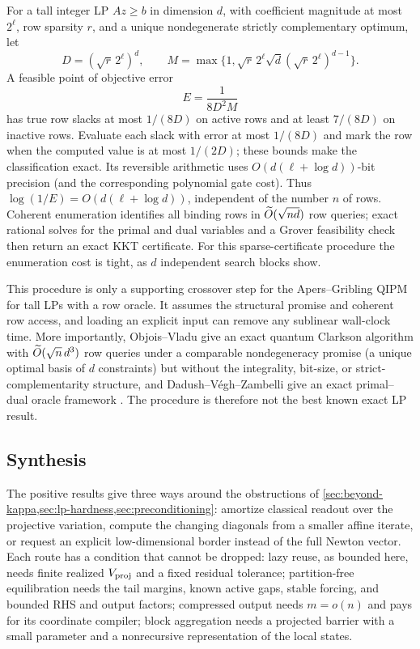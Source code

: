 For a tall integer LP $Az\geq b$ in dimension $d$, with coefficient magnitude
at most $2^\ell$, row sparsity $r$, and a unique nondegenerate strictly
complementary optimum, let
\[
 D=(\sqrt r\,2^\ell)^d,\qquad
 M=\max\{1,\sqrt r\,2^\ell\sqrt d
                 (\sqrt r\,2^\ell)^{d-1}\}.
\]
A feasible point of objective error
\begin{equation}
 E=\frac{1}{8D^2M}                                      \label{eq:positive-crossover-accuracy}
\end{equation}
has true row slacks at most $1/(8D)$ on active rows and at least $7/(8D)$ on
inactive rows.  Evaluate each slack with error at most $1/(8D)$ and mark the
row when the computed value is at most $1/(2D)$; these bounds make the
classification exact.  Its reversible arithmetic uses
$O(d(\ell+\log d))$-bit precision (and the corresponding polynomial gate
cost).  Thus $\log(1/E)=O(d(\ell+\log d))$, independent of the number $n$ of
rows.  Coherent enumeration identifies all binding rows in
$\widetilde{O}(\sqrt{nd})$ row queries; exact rational solves for the primal and dual
variables and a Grover feasibility check then return an exact KKT certificate.
For this sparse-certificate procedure the enumeration cost is tight, as $d$
independent search blocks show.

This procedure is only a supporting crossover step for the Apers--Gribling
QIPM for tall LPs with a row oracle.  It assumes the structural promise and
coherent row access, and loading an explicit input can remove any sublinear
wall-clock time.  More importantly, Objois--Vladu give an exact quantum Clarkson algorithm with
$\widetilde{O}(\sqrt n\,d^3)$ row queries under a comparable nondegeneracy promise
(a unique optimal basis of $d$ constraints) but without the integrality,
bit-size, or strict-complementarity structure, and
Dadush--V\'egh--Zambelli give an exact primal--dual oracle framework
\cite{positive-objois2025-adaptive-sparsification,
positive-dadush2026-exact-oracle-lp}.  The procedure is therefore not the
best known exact LP result.

\subsection{Synthesis}
\label{sec:positive-synthesis}

The positive results give three ways around the obstructions of
\cref{sec:beyond-kappa,sec:lp-hardness,sec:preconditioning}: amortize
classical readout over the projective variation, compute the changing
diagonals from a smaller affine iterate, or request an explicit
low-dimensional border instead of the full Newton vector.  Each route has a
condition that cannot be dropped: lazy reuse, as bounded here, needs finite
realized $V_{\rm proj}$ and a fixed residual tolerance; partition-free
equilibration needs the tail margins, known active gaps, stable forcing, and
bounded RHS and output factors; compressed output needs $m=o(n)$ and pays for
its coordinate compiler; block aggregation needs a projected barrier with a
small parameter and a nonrecursive representation of the local states.

